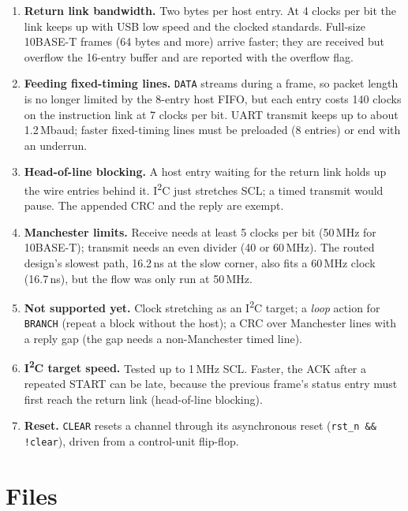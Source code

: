 \documentclass[11pt,a4paper]{article}
\newcommand{\sig}[1]{\texttt{#1}}
\begin{document}
\begin{enumerate}
\item \textbf{Return link bandwidth.} Two bytes per host entry. At 4 clocks per bit the link keeps up with USB low speed and the clocked standards. Full-size 10BASE-T frames (64 bytes and more) arrive faster; they are received but overflow the 16-entry buffer and are reported with the overflow flag.
\item \textbf{Feeding fixed-timing lines.} \sig{DATA} streams during a frame, so packet length is no longer limited by the 8-entry host FIFO, but each entry costs 140 clocks on the instruction link at 7 clocks per bit. UART transmit keeps up to about 1.2\,Mbaud; faster fixed-timing lines must be preloaded (8 entries) or end with an underrun.
\item \textbf{Head-of-line blocking.} A host entry waiting for the return link holds up the wire entries behind it. I\textsuperscript{2}C just stretches SCL; a timed transmit would pause. The appended CRC and the reply are exempt.
\item \textbf{Manchester limits.} Receive needs at least 5 clocks per bit (50\,MHz for 10BASE-T); transmit needs an even divider (40 or 60\,MHz). The routed design's slowest path, 16.2\,ns at the slow corner, also fits a 60\,MHz clock (16.7\,ns), but the flow was only run at 50\,MHz.
\item \textbf{Not supported yet.} Clock stretching as an I\textsuperscript{2}C target; a \emph{loop} action for \sig{BRANCH} (repeat a block without the host); a CRC over Manchester lines with a reply gap (the gap needs a non-Manchester timed line).
\item \textbf{I\textsuperscript{2}C target speed.} Tested up to 1\,MHz SCL. Faster, the ACK after a repeated START can be late, because the previous frame's status entry must first reach the return link (head-of-line blocking).
\item \textbf{Reset.} \sig{CLEAR} resets a channel through its asynchronous reset (\sig{rst\_n \&\& !clear}), driven from a control-unit flip-flop.
\end{enumerate}

\section{Files}
\end{document}
